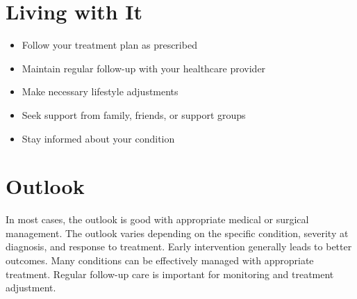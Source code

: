 \section{Living with It}
\begin{itemize}[noitemsep]
  \item Follow your treatment plan as prescribed
  \item Maintain regular follow-up with your healthcare provider
  \item Make necessary lifestyle adjustments
  \item Seek support from family, friends, or support groups
  \item Stay informed about your condition
\end{itemize}
\section{Outlook}
In most cases, the outlook is good with appropriate medical or surgical management. The outlook varies depending on the specific condition, severity at diagnosis, and response to treatment. Early intervention generally leads to better outcomes. Many conditions can be effectively managed with appropriate treatment. Regular follow-up care is important for monitoring and treatment adjustment.
